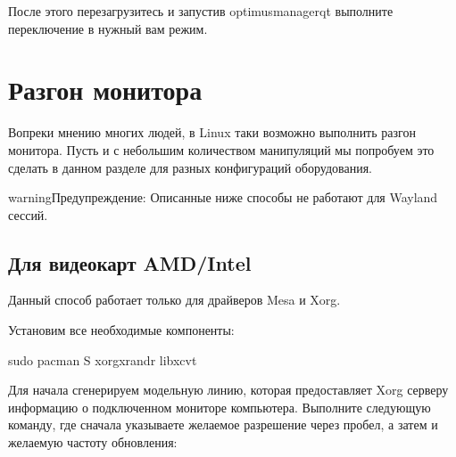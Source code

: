 \documentclass[letterpaper,10pt,russian,openany]{sphinxmanual}
\begin{document}
\sphinxAtStartPar
После этого перезагрузитесь и запустив optimus\sphinxhyphen{}manager\sphinxhyphen{}qt выполните переключение в нужный вам режим.

\ignorespaces 

\section{Разгон монитора }
\label{\detokenize{source/first-steps:monitor-overlocking}}\label{\detokenize{source/first-steps:index-13}}\label{\detokenize{source/first-steps:id13}}
\sphinxAtStartPar
Вопреки мнению многих людей, в Linux таки возможно выполнить разгон монитора.
Пусть и с небольшим количеством манипуляций мы попробуем это сделать в данном разделе
для разных конфигураций оборудования.

\begin{sphinxadmonition}{warning}{Предупреждение:}
\sphinxAtStartPar
Описанные ниже способы не работают для Wayland сессий.
\end{sphinxadmonition}

\ignorespaces 

\subsection{Для видеокарт AMD/Intel}
\label{\detokenize{source/first-steps:amd-intel}}\label{\detokenize{source/first-steps:monitor-overlocking-mesa}}\label{\detokenize{source/first-steps:index-14}}
\sphinxAtStartPar
Данный способ работает только для драйверов Mesa и Xorg.

\sphinxAtStartPar
Установим все необходимые компоненты:

\begin{sphinxVerbatim}[commandchars=\\\{\}]
sudo pacman \PYGZhy{}S xorg\PYGZhy{}xrandr libxcvt
\end{sphinxVerbatim}

\sphinxAtStartPar
Для начала сгенерируем модельную линию, которая предоставляет Xorg серверу информацию о подключенном мониторе компьютера.
Выполните следующую команду, где сначала указываете желаемое разрешение через пробел, а затем и желаемую частоту обновления:
\end{document}
